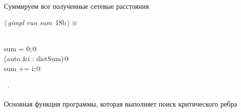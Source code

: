 \documentclass[12pt]{article}
\begin{document}
\paragraph{}
Суммируем все полученные сетевые расстояния
\begin{flushleft} \small
\begin{minipage}{\linewidth}\label{scrap30}\raggedright\small
{} $\langle\,${\itshape gimpl run sum}\nobreak\ {\footnotesize {18b}}$\,\rangle\equiv$
\vspace{-1ex}
\begin{list}{}{} \item
\mbox{}\verb@@\\
\mbox{}\verb@double sum = 0;@\\
\mbox{}\verb@for (auto &i : distSum)@\\
\mbox{}\verb@    sum += i;@\\
\mbox{}\verb@@{\NWsep}
\end{list}
\vspace{-1.5ex}
\footnotesize
\begin{list}{}{\setlength{\itemsep}{-\parsep}\setlength{\itemindent}{-\leftmargin}}
\item \NWtxtMacroRefIn\ .

\item{}
\end{list}
\end{minipage}\vspace{4ex}
\end{flushleft}
\paragraph{}
Основная функция программы, которая выполняет поиск критического ребра
\end{document}
